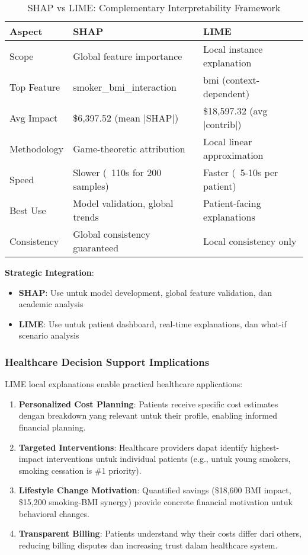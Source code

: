 \begin{table}[H]
\centering
\caption{SHAP vs LIME: Complementary Interpretability Framework}
\label{tab:shap-vs-lime}
\begin{tabular}{|l|l|l|}
\hline
\textbf{Aspect} & \textbf{SHAP} & \textbf{LIME} \\
\hline
Scope & Global feature importance & Local instance explanation \\
Top Feature & smoker\_bmi\_interaction & bmi (context-dependent) \\
Avg Impact & \$6,397.52 (mean |SHAP|) & \$18,597.32 (avg |contrib|) \\
Methodology & Game-theoretic attribution & Local linear approximation \\
Speed & Slower (~110s for 200 samples) & Faster (~5-10s per patient) \\
Best Use & Model validation, global trends & Patient-facing explanations \\
Consistency & Global consistency guaranteed & Local consistency only \\
\hline
\end{tabular}
\end{table}

\textbf{Strategic Integration}:
\begin{itemize}
    \item \textbf{SHAP}: Use untuk model development, global feature validation, dan academic analysis
    \item \textbf{LIME}: Use untuk patient dashboard, real-time explanations, dan what-if scenario analysis
\end{itemize}

\subsubsection{Healthcare Decision Support Implications}

LIME local explanations enable practical healthcare applications:

\begin{enumerate}
    \item \textbf{Personalized Cost Planning}: Patients receive specific cost estimates dengan breakdown yang relevant untuk their profile, enabling informed financial planning.

    \item \textbf{Targeted Interventions}: Healthcare providers dapat identify highest-impact interventions untuk individual patients (e.g., untuk young smokers, smoking cessation is \#1 priority).

    \item \textbf{Lifestyle Change Motivation}: Quantified savings (\$18,600 BMI impact, \$15,200 smoking-BMI synergy) provide concrete financial motivation untuk behavioral changes.

    \item \textbf{Transparent Billing}: Patients understand why their costs differ dari others, reducing billing disputes dan increasing trust dalam healthcare system.
\end{enumerate}

